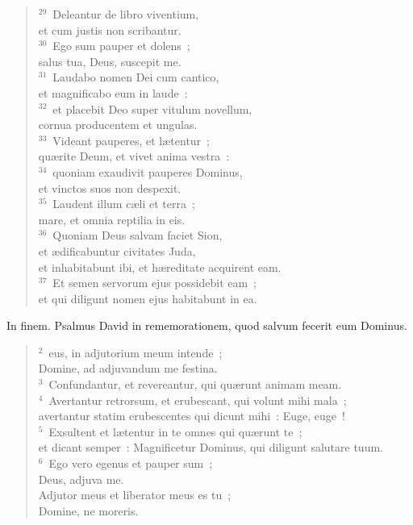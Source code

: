 \begin{verse}
${}^{29}$~Deleantur de libro viventium,\\ et cum justis non scribantur.\\
${}^{30}$~Ego sum pauper et dolens~;\\ salus tua, Deus, suscepit me.\\
${}^{31}$~Laudabo nomen Dei cum cantico,\\ et magnificabo eum in laude~:\\
${}^{32}$~et placebit Deo super vitulum novellum,\\ cornua producentem et ungulas.\\
${}^{33}$~Videant pauperes, et l\ae tentur~;\\ qu\ae rite Deum, et vivet anima vestra~:\\
${}^{34}$~quoniam exaudivit pauperes Dominus,\\ et vinctos suos non despexit.\\
${}^{35}$~Laudent illum c\ae li et terra~;\\ mare, et omnia reptilia in eis.\\
${}^{36}$~Quoniam Deus salvam faciet Sion,\\ et \ae dificabuntur civitates Juda,\\ et inhabitabunt ibi, et h\ae reditate acquirent eam.\\
${}^{37}$~Et semen servorum ejus possidebit eam~;\\ et qui diligunt nomen ejus habitabunt in ea.\end{verse}



\bchapter[Psalm]
In finem. Psalmus David in rememorationem, quod salvum fecerit eum Dominus.
\begin{verse}${}^{2}$~eus, in adjutorium meum intende~;\\ Domine, ad adjuvandum me festina.\\
${}^{3}$~Confundantur, et revereantur, qui qu\ae runt animam meam.\\
${}^{4}$~Avertantur retrorsum, et erubescant, qui volunt mihi mala~;\\ avertantur statim erubescentes qui dicunt mihi~: Euge, euge~!\\
${}^{5}$~Exsultent et l\ae tentur in te omnes qui qu\ae runt te~;\\ et dicant semper~: Magnificetur Dominus, qui diligunt salutare tuum.\\
${}^{6}$~Ego vero egenus et pauper sum~;\\ Deus, adjuva me.\\ Adjutor meus et liberator meus es tu~;\\ Domine, ne moreris.\end{verse}




